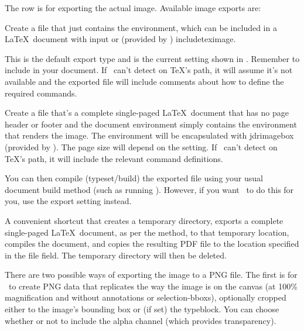 The  row is for exporting the
actual image. Available image exports are:
\begin{deflist}
\begin{itemdesc}
Create a file that just contains the  environment,
which can be included in a \LaTeX\ document with \gls{input}
or (provided by ) \gls{includeteximage}.

This is the default export type and is the current setting shown in
. Remember to include 
 in your document. If \FlowframTk\ can't detect
 on \TeX's path, it will assume it's not
available and the exported file will include comments about how to
define the required commands.
\end{itemdesc}


\begin{itemdesc}
Create a file that's a complete single-paged \LaTeX\ document that
has no page header or footer and the document environment simply
contains the  environment that renders the image.
The  environment will be encapsulated with
\gls{jdrimagebox} (provided by ).
The page size will depend on the  setting.
If \FlowframTk\ can't detect  on \TeX's path,
it will include the relevant command definitions.

You can then compile (typeset/build) the exported file using your
usual document build method (such as running ).
However, if you want \FlowframTk\ to do this for you, use the 
 export setting instead.
\end{itemdesc}


\begin{itemdesc}
A convenient shortcut that creates a temporary directory, 
exports a complete single-paged \LaTeX\
document, as per the  method, to that
temporary location, compiles the document, and copies the resulting
PDF file to the location specified in the file field. The temporary
directory will then be deleted.
\end{itemdesc}


\begin{itemdesc}
There are two possible ways of exporting the image to a PNG file.
The first is for \FlowframTk\ to create PNG data that replicates
the way the image is \glslink{painting}{drawn} on the \gls{canvas}
(at 100\% magnification and without annotations or
\glspl{selection-bbox}), optionally cropped either to the image's
bounding box or (if set) the \gls{typeblock}. You can choose whether
or not to include the alpha channel (which provides transparency).


\end{itemdesc}
\end{deflist}
